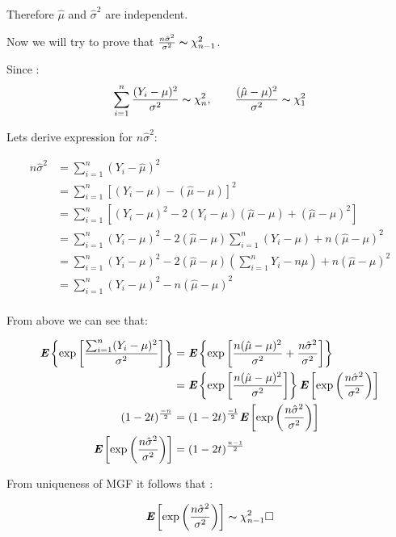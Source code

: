 Therefore $\hat{\mu}$ and $\hat{\sigma}^2$ are independent.

Now we will try to prove that $\frac{n\hat{\sigma}^2}{\sigma^2} \thicksim \chi_{n-1}^2$.

Since :
\begin{equation}
\sum_{i=1}^n\frac{(Y_i - \mu)^2}{\sigma^2} \thicksim \chi_{n}^2, \qquad \frac{(\hat{\mu} - \mu)^2}{\sigma^2} \thicksim \chi_{1}^2
\end{equation}

Lets derive expression for $n\hat{\sigma}^2$:

\begin{equation}
\begin{aligned}
n\hat{\sigma}^2 &= \sum_{i=1}^n(Y_i - \hat{\mu})^2 \\
								&= \sum_{i=1}^n\left[(Y_i - \mu) - (\hat{\mu} - \mu)\right]^2 \\
								&= \sum_{i=1}^n\left[(Y_i - \mu)^2 -2(Y_i - \mu)(\hat{\mu} - \mu) + (\hat{\mu} - \mu)^2\right] \\
								&= \sum_{i=1}^n(Y_i - \mu)^2 -2(\hat{\mu} - \mu)\sum_{i=1}^n(Y_i - \mu) + n(\hat{\mu} - \mu)^2 \\
								&= \sum_{i=1}^n(Y_i - \mu)^2 -2(\hat{\mu} - \mu)(\sum_{i=1}^nY_i - n\mu) + n(\hat{\mu} - \mu)^2 \\
								&= \sum_{i=1}^n(Y_i - \mu)^2 -n(\hat{\mu} - \mu)^2 \\
\end{aligned}
\end{equation}

From above we can see that:

\begin{equation}
\begin{aligned}
\textbf{\em E}\left\{\exp\left[\frac{\sum_{i=1}^n(Y_i - \mu)^2}{\sigma^2}\right]\right\} 
							&= \textbf{\em E}\left\{\exp\left[\frac{n(\hat{\mu} - \mu)^2}{\sigma^2} + \frac{n\hat{\sigma}^2}{\sigma^2}\right]\right\} \\
							&= \textbf{\em E}\left\{\exp\left[\frac{n(\hat{\mu} - \mu)^2}{\sigma^2}\right]\right\}\textbf{\em E}\left[\exp\left(\frac{n\hat{\sigma}^2}{\sigma^2}\right)\right] \\
(1-2t)^\frac{-n}{2} 
							&= (1-2t)^\frac{-1}{2}\textbf{\em E}\left[\exp\left(\frac{n\hat{\sigma}^2}{\sigma^2}\right)\right]  \\
\textbf{\em E}\left[\exp\left(\frac{n\hat{\sigma}^2}{\sigma^2}\right)\right]  
							&= (1-2t)^\frac{n-1}{2}							
\end{aligned}
\end{equation}

From uniqueness of MGF it follows that :

\begin{equation}
\textbf{\em E}\left[\exp\left(\frac{n\hat{\sigma}^2}{\sigma^2}\right)\right]  
							\thicksim \chi^2_{n-1} \square							
\end{equation}

